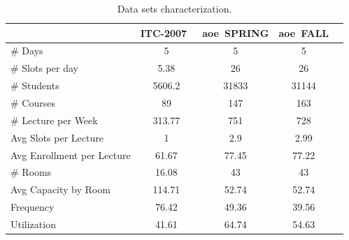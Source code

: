 \documentclass[runningheads]{llncs}
\newcommand{\uni}{\gls{aoe}}
\begin{document}
\begin{table}[t]
\caption{Data sets characterization.}
\label{tab:dataSet}
\centering
\begin{tabular}{|l|c|c|c|c|}
\hline
                                          &  \textbf{ITC-2007~\cite{di2007second}} &  \textbf{\uni \ \textsc{SPRING}} & \textbf{\uni \ \textsc{FALL}} \\ \hline
\# Days                           & 5            & 5                & 5                \\ \hline
\# Slots per day                         & 5.38             & 26               & 26               \\ \hline
\# Students\footnotemark                        & 5606.2                & 31833            & 31144            \\ \hline
\# Courses                       & 89               & 147              & 163              \\ \hline
\# Lecture per Week             & 313.77          & 751              & 728              \\ \hline
Avg Slots per Lecture       & 1               & 2.9            & 2.99            \\ \hline
Avg Enrollment per Lecture                     & 61.67            & 77.45            & 77.22            \\ \hline
\# Rooms                          & 16.08             & 43               & 43               \\ \hline
Avg Capacity by Room                                & 114.71           & 52.74            & 52.74            \\ \hline
Frequency                                              & 76.42           & 49.36            & 39.56            \\ \hline
Utilization                                              & 41.61          & 64.74            & 54.63            \\ \hline

\end{tabular}
\end{table}
 
\end{document}
